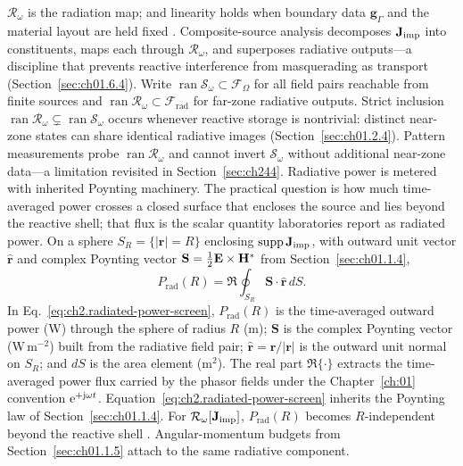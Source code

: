 \(\mathcal{R}_\omega\) is the radiation map; and linearity holds when boundary data
\(\mathbf{g}_\Gamma\) and the material layout are held fixed \cite{maxwell1873}.
Composite-source analysis decomposes \(\mathbf{J}_{\mathrm{imp}}\) into constituents,
maps each through \(\mathcal{R}_\omega\), and superposes radiative outputs---a
discipline that prevents reactive interference from masquerading as transport
(Section~\ref{sec:ch01.6.4}).
Write \(\operatorname{ran}\mathcal{S}_\omega\subset\mathcal{F}_\Omega\) for all
field pairs reachable from finite sources and
\(\operatorname{ran}\mathcal{R}_\omega\subset\mathcal{F}_{\mathrm{rad}}\) for
far-zone radiative outputs. Strict inclusion
\(\operatorname{ran}\mathcal{R}_\omega\subsetneq\operatorname{ran}\mathcal{S}_\omega\)
occurs whenever reactive storage is nontrivial: distinct near-zone states can share
identical radiative images (Section~\ref{sec:ch01.2.4}). Pattern measurements
probe \(\operatorname{ran}\mathcal{R}_\omega\) and cannot invert
\(\mathcal{S}_\omega\) without additional near-zone data---a limitation revisited in
Section~\ref{sec:ch244}.
Radiative power is metered with inherited Poynting machinery.
The practical question is how much time-averaged power crosses a closed surface that
encloses the source and lies beyond the reactive shell; that flux is the scalar
quantity laboratories report as radiated power.
On a sphere
\(S_R=\{|\mathbf{r}|=R\}\) enclosing \(\operatorname{supp}\mathbf{J}_{\mathrm{imp}}\), with outward
unit vector \(\hat{\mathbf{r}}\) and complex Poynting vector
\(\mathbf{S}=\tfrac{1}{2}\mathbf{E}\times\mathbf{H}^*\) from Section~\ref{sec:ch01.1.4},
\begin{equation}
\label{eq:ch2.radiated-power-screen}
P_{\mathrm{rad}}(R)
=
\Re\oint_{S_R}\mathbf{S}\cdot\hat{\mathbf{r}}\,dS.
\end{equation}
In Eq.~\eqref{eq:ch2.radiated-power-screen},
\(P_{\mathrm{rad}}(R)\) is the time-averaged outward power (W) through the sphere
of radius \(R\) (m);
\(\mathbf{S}\) is the complex Poynting vector (W\,m\(^{-2}\)) built from the
radiative field pair;
\(\hat{\mathbf{r}}=\mathbf{r}/|\mathbf{r}|\) is the outward unit normal on
\(S_R\); and \(dS\) is the area element (m\(^{2}\)).
The real part \(\Re\{\cdot\}\) extracts the time-averaged power flux carried by the
phasor fields under the Chapter~\ref{ch:01} convention $\mathrm{e}^{+\mathrm{j}\omega t}$.
Equation~\eqref{eq:ch2.radiated-power-screen} inherits the Poynting law of
Section~\ref{sec:ch01.1.4}. For \(\mathcal{R}_\omega[\mathbf{J}_{\mathrm{imp}}]\), \(P_{\mathrm{rad}}(R)\) becomes
$R$-independent beyond the reactive shell \cite{poynting1884}. Angular-momentum budgets from
Section~\ref{sec:ch01.1.5} attach to the same radiative component.
